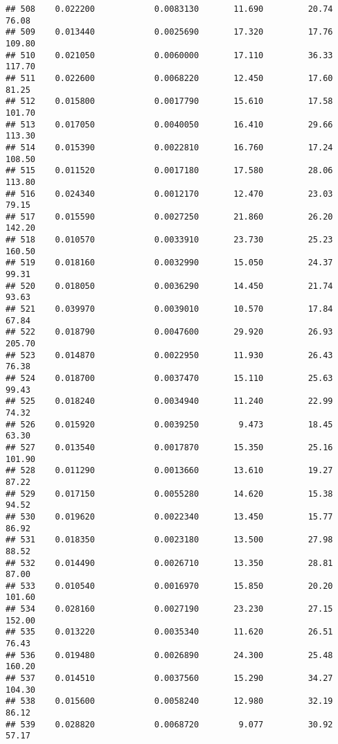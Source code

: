 \documentclass[
]{article}
\begin{document}
\begin{verbatim}
## 508    0.022200            0.0083130       11.690         20.74           76.08
## 509    0.013440            0.0025690       17.320         17.76          109.80
## 510    0.021050            0.0060000       17.110         36.33          117.70
## 511    0.022600            0.0068220       12.450         17.60           81.25
## 512    0.015800            0.0017790       15.610         17.58          101.70
## 513    0.017050            0.0040050       16.410         29.66          113.30
## 514    0.015390            0.0022810       16.760         17.24          108.50
## 515    0.011520            0.0017180       17.580         28.06          113.80
## 516    0.024340            0.0012170       12.470         23.03           79.15
## 517    0.015590            0.0027250       21.860         26.20          142.20
## 518    0.010570            0.0033910       23.730         25.23          160.50
## 519    0.018160            0.0032990       15.050         24.37           99.31
## 520    0.018050            0.0036290       14.450         21.74           93.63
## 521    0.039970            0.0039010       10.570         17.84           67.84
## 522    0.018790            0.0047600       29.920         26.93          205.70
## 523    0.014870            0.0022950       11.930         26.43           76.38
## 524    0.018700            0.0037470       15.110         25.63           99.43
## 525    0.018240            0.0034940       11.240         22.99           74.32
## 526    0.015920            0.0039250        9.473         18.45           63.30
## 527    0.013540            0.0017870       15.350         25.16          101.90
## 528    0.011290            0.0013660       13.610         19.27           87.22
## 529    0.017150            0.0055280       14.620         15.38           94.52
## 530    0.019620            0.0022340       13.450         15.77           86.92
## 531    0.018350            0.0023180       13.500         27.98           88.52
## 532    0.014490            0.0026710       13.350         28.81           87.00
## 533    0.010540            0.0016970       15.850         20.20          101.60
## 534    0.028160            0.0027190       23.230         27.15          152.00
## 535    0.013220            0.0035340       11.620         26.51           76.43
## 536    0.019480            0.0026890       24.300         25.48          160.20
## 537    0.014510            0.0037560       15.290         34.27          104.30
## 538    0.015600            0.0058240       12.980         32.19           86.12
## 539    0.028820            0.0068720        9.077         30.92           57.17

\end{verbatim}
\end{document}

